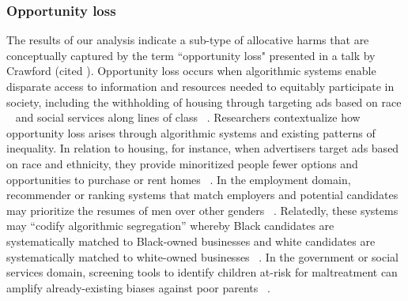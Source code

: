 \subsubsection{Opportunity loss} The results of our analysis indicate a sub-type of allocative harms that are conceptually captured by the term ``opportunity loss" presented in a talk by Crawford (cited \cite[n.p.]{barocas-hardt-narayanan}). Opportunity loss occurs when algorithmic systems enable disparate access to information and resources needed to equitably participate in society, including the withholding of housing through targeting ads based on race ~\cite{Angwin_Parris_2016} and social services along lines of class ~\cite{Eubanks_2018}. Researchers contextualize how opportunity loss arises through algorithmic systems and existing patterns of inequality. In relation to housing, for instance, when advertisers target ads based on race and ethnicity, they provide minoritized people fewer options and opportunities to purchase or rent homes ~\cite{Angwin_Parris_2016}. In the employment domain, recommender or ranking systems that match employers and potential candidates may prioritize the resumes of men over other genders ~\cite{Singh_Joachims_2018, vanEs_2021}. Relatedly, these systems may “codify algorithmic segregation” whereby Black candidates are systematically matched to Black-owned businesses and white candidates are systematically matched to white-owned businesses ~\cite[p. 704]{Wu_Mitra_Ma_Diaz_Liu_2022}. In the government or social services domain, screening tools to identify children at-risk for maltreatment can amplify already-existing biases against poor parents ~\cite{Eubanks_2018, Wu_Mitra_Ma_Diaz_Liu_2022}.

